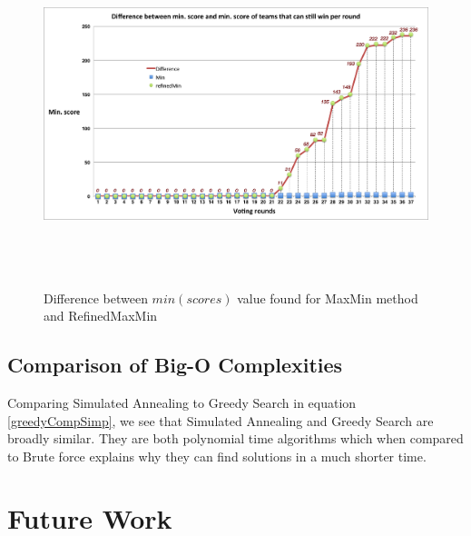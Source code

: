 \documentclass[12pt]{report}
\begin{document}
\begin{figure}[H]
\centering
\includegraphics[width=17cm, height=10cm]{../code/misc/difference_MinvsRefinedMin}
\caption{Difference between $min(scores)$ value found for MaxMin method and RefinedMaxMin}
\label{f_maxminDif}
\end{figure}



\subsection{Comparison of Big-O Complexities}
Comparing Simulated Annealing to Greedy Search in equation \ref{greedyCompSimp}, we see that Simulated Annealing and Greedy Search are broadly similar. They are both polynomial time algorithms which when compared to Brute force explains why they can find solutions in a much shorter time. 


\section{Future Work}\label{FutureWork}

\end{document}
